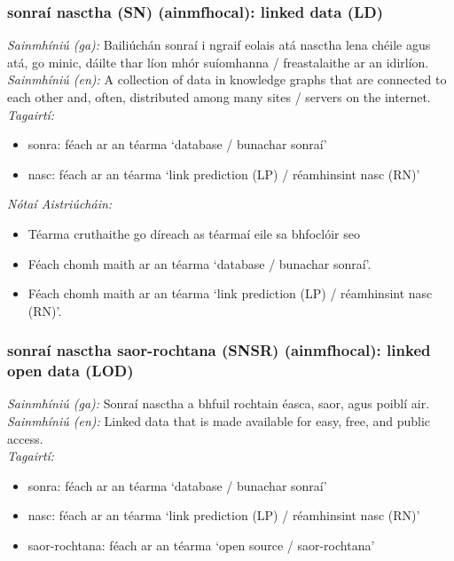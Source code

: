 \subsubsection*{sonraí nasctha (SN) (ainmfhocal): linked data (LD)}
 \noindent \textit{Sainmhíniú (ga):} Bailiúchán sonraí i ngraif eolais atá nasctha lena chéile agus atá, go minic, dáilte thar líon mhór suíomhanna / freastalaithe ar an idirlíon.
\\
 \noindent \textit{Sainmhíniú (en):} A collection of data in knowledge graphs that are connected to each other and, often, distributed among many sites / servers on the internet.
\\
 \noindent \textit{Tagairtí:}
\begin{itemize}
	\item sonra: féach ar an téarma `database / bunachar sonraí'
	\item nasc: féach ar an téarma `link prediction (LP) / réamhinsint nasc (RN)'
\end{itemize}

 \noindent \textit{Nótaí Aistriúcháin:}
\begin{itemize}
	\item Téarma cruthaithe go díreach as téarmaí eile sa bhfoclóir seo
	\item Féach chomh maith ar an téarma `database / bunachar sonraí'.
	\item Féach chomh maith ar an téarma `link prediction (LP) / réamhinsint nasc (RN)'.
\end{itemize}


\subsubsection*{sonraí nasctha saor-rochtana (SNSR) (ainmfhocal): linked open data (LOD)}
 \noindent \textit{Sainmhíniú (ga):} Sonraí nasctha a bhfuil rochtain éasca, saor, agus poiblí air.
\\
 \noindent \textit{Sainmhíniú (en):} Linked data that is made available for easy, free, and public access.
\\
 \noindent \textit{Tagairtí:}
\begin{itemize}
	\item sonra: féach ar an téarma `database / bunachar sonraí'
	\item nasc: féach ar an téarma `link prediction (LP) / réamhinsint nasc (RN)'
	\item saor-rochtana: féach ar an téarma `open source / saor-rochtana'
\end{itemize}


